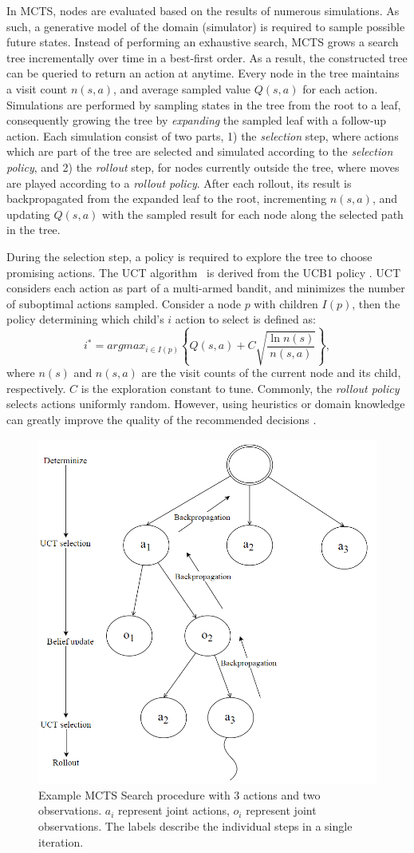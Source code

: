 \documentclass[conference]{IEEEtran}
\begin{document}
In MCTS, nodes are evaluated based on the results of numerous simulations. As such, a generative model of the domain (\ie simulator) is required to sample possible future states. Instead of performing an exhaustive search, MCTS grows a search tree incrementally over time in a best-first order. As a result, the constructed tree can be queried to return an action at anytime. Every node in the tree maintains a visit count $n(s,a)$, and average sampled value $Q(s,a)$ for each action. Simulations are performed by sampling states in the tree from the root to a leaf, consequently growing the tree by \emph{expanding} the sampled leaf with a follow-up action. Each simulation consist of two parts, 1) the \emph{selection} step, where actions which are part of the tree are selected and simulated according to the {\it selection policy}, and 2) the \emph{rollout} step, for nodes currently outside the tree, where moves are played according to a \emph{rollout policy}. After each rollout, its result is backpropagated from the expanded leaf to the root, incrementing $n(s,a)$, and updating $Q(s,a)$ with the sampled result for each node along the selected path in the tree.

During the selection step, a policy is required to explore the tree to choose promising actions. The UCT algorithm~\cite{kocsis2006bandit} is derived from the UCB1 policy \cite{auer2002using}. UCT considers each action as part of a multi-armed bandit, and minimizes the number of suboptimal actions sampled. Consider a node $p$ with children $I(p)$, then the policy determining which child's $i$ action to select is defined as:
\begin{equation}
\label{eq:uct}
i^* = argmax_{i \in I(p)}\left\{ Q(s,a) + C \sqrt{ \frac{\ln{n(s)}}{n(s, a)}}\right\},
\end{equation}
where $n(s)$ and $n(s, a)$ are the visit counts of the current node and its child, respectively. $C$ is the exploration constant to tune. Commonly, the \emph{rollout policy} selects actions uniformly random. However, using heuristics or domain knowledge can greatly improve the quality of the recommended decisions \cite{browne2012survey}.

\begin{figure}
\begin{center}
 \includegraphics[width=.44\textwidth]{img/searchtree.png}
 \caption{Example MCTS Search procedure with 3 actions and two observations. $a_i$ represent joint actions, $o_i$ represent joint observations. The labels describe the individual steps in a single iteration.}\label{fig:searchtree}
\end{center}
\end{figure}
\end{document}
